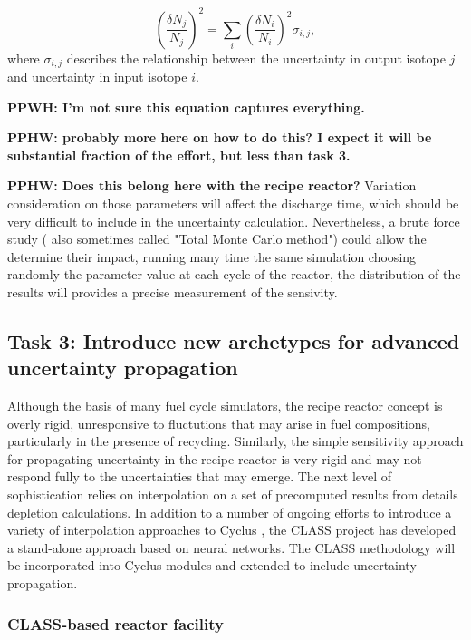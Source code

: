 \documentclass[dvips,12pt]{article}
\newcommand{\unc}[1]
{ \delta #1 }
\newcommand{\uncratio}[1]
{ \left(\frac{\unc{#1}}{#1}\right) }
\newcommand{\uncratiosq}[1]
{ \uncratio{#1}^2 }
\newcommand{\comment}[1]
{{\bfseries \color{red} #1}}
\begin{document}
\begin{equation}
\uncratiosq{N_j} = \sum_i \uncratiosq{N_i} \sigma_{i,j},
\end{equation}
where $\sigma_{i,j}$ describes the relationship
between the uncertainty in output isotope $j$ and
uncertainty in input isotope $i$.

\comment{PPWH: I'm not sure this equation captures
  everything.}

\comment{PPHW: probably more here on how to do
  this?  I expect it will be substantial
  fraction of the effort, but less than task 3.}

\comment{PPHW: Does this belong here with the
  recipe reactor?}  Variation consideration on
those parameters will affect the discharge time,
which should be very difficult to include in the
uncertainty calculation. Nevertheless, a brute
force study ( also sometimes called "Total Monte
Carlo method") could allow the determine their
impact, running many time the same simulation
choosing randomly the parameter value at each
cycle of the reactor, the distribution of the
results will provides a precise measurement of the
sensivity.

\subsection{Task 3: Introduce new archetypes for advanced uncertainty propagation}

Although the basis of many fuel cycle simulators,
the recipe reactor concept is overly rigid,
unresponsive to fluctutions that may arise in fuel
compositions, particularly in the presence of
recycling.  Similarly, the simple sensitivity
approach for propagating uncertainty in the recipe
reactor is very rigid and may not respond fully to
the uncertainties that may emerge.  The next level
of sophistication relies on interpolation on a set
of precomputed results from details depletion
calculations.  In addition to a number of ongoing
efforts to introduce a variety of interpolation
approaches to Cyclus \cite{britelite, cyborg}, the
CLASS project has developed a stand-alone approach
based on neural networks\cite{CLASS}.  The CLASS
methodology will be incorporated into Cyclus
modules and extended to include uncertainty
propagation.

\subsubsection{CLASS-based reactor facility}
\end{document}

